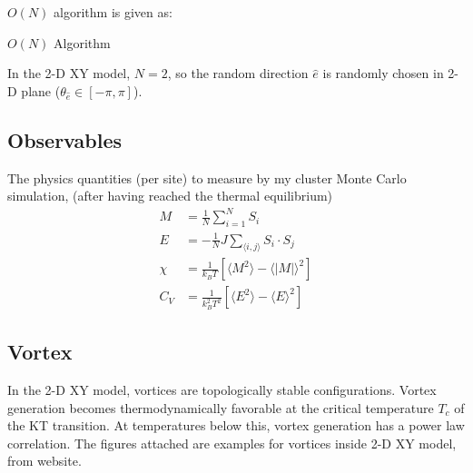 \documentclass[a4paper]{article}
\begin{document}
$O(N)$ algorithm is given as:

\begin{algorithm}[H]

 \caption{$O(N)$ Algorithm}
\end{algorithm}

In the 2-D XY model, $N = 2$, so the random direction $\hat{e}$ is randomly chosen in 2-D plane ($\theta_{\hat{e}} \in [-\pi, \pi]$).

\subsection{Observables}

The physics quantities (per site) to measure by my cluster Monte Carlo simulation, (after having reached the thermal equilibrium)
\begin{align*}
M &= \displaystyle\frac{1}{N}\displaystyle \sum_{i=1}^N S_i\\
E &= - \displaystyle\frac{1}{N}J \displaystyle \sum_{\langle i,j\rangle} S_i \cdot S_j\\
\chi &= \displaystyle\frac{1}{k_B T}[\langle M^2 \rangle  - \langle |M| \rangle ^2]\\
C_V &= \displaystyle\frac{1}{k_B^2 T^2}[\langle E^2 \rangle  - \langle E \rangle ^2]
\end{align*}

\subsection{Vortex}

In the 2-D XY model, vortices are topologically stable configurations. Vortex generation becomes thermodynamically favorable at the critical temperature $T_{c}$ of the KT transition. At temperatures below this, vortex generation has a power law correlation. The figures attached are examples for vortices inside 2-D XY model, from website\cite{WebThe2DXYmodel}.
\end{document}
